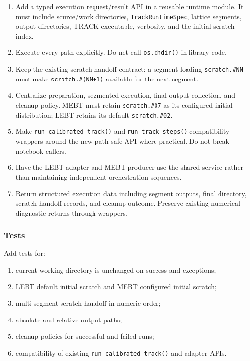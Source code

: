 \documentclass[
]{article}
\providecommand{\tightlist}{%
  \setlength{\itemsep}{0pt}\setlength{\parskip}{0pt}}
\begin{document}
\begin{enumerate}
\def\labelenumi{\arabic{enumi}.}
\tightlist
\item
  Add a typed execution request/result API in a reusable runtime module.
  It must include source/work directories, \texttt{TrackRuntimeSpec},
  lattice segments, output directories, TRACK executable, verbosity, and
  the initial scratch index.
\item
  Execute every path explicitly. Do not call \texttt{os.chdir()} in
  library code.
\item
  Keep the existing scratch handoff contract: a segment loading
  \texttt{scratch.\#NN} must make \texttt{scratch.\#(NN+1)} available
  for the next segment.
\item
  Centralize preparation, segmented execution, final-output collection,
  and cleanup policy. MEBT must retain \texttt{scratch.\#07} as its
  configured initial distribution; LEBT retains its default
  \texttt{scratch.\#02}.
\item
  Make \texttt{run\_calibrated\_track()} and
  \texttt{run\_track\_steps()} compatibility wrappers around the new
  path-safe API where practical. Do not break notebook callers.
\item
  Have the LEBT adapter and MEBT producer use the shared service rather
  than maintaining independent orchestration sequences.
\item
  Return structured execution data including segment outputs, final
  directory, scratch handoff records, and cleanup outcome. Preserve
  existing numerical diagnostic returns through wrappers.
\end{enumerate}

\hypertarget{tests-5}{%
\subsubsection{Tests}\label{tests-5}}

Add tests for:

\begin{enumerate}
\def\labelenumi{\arabic{enumi}.}
\tightlist
\item
  current working directory is unchanged on success and exceptions;
\item
  LEBT default initial scratch and MEBT configured initial scratch;
\item
  multi-segment scratch handoff in numeric order;
\item
  absolute and relative output paths;
\item
  cleanup policies for successful and failed runs;
\item
  compatibility of existing \texttt{run\_calibrated\_track()} and
  adapter APIs.
\end{enumerate}
\end{document}
